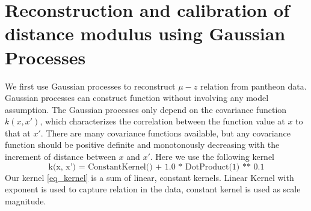 \section{Reconstruction and calibration of distance modulus using Gaussian Processes}
\label{results_gp_pantheon}
We first use Gaussian processes to  reconstruct $\mu-z$ relation from pantheon data. Gaussian processes can construct function without involving any model assumption. The Gaussian processes only depend on the covariance function $k(x, x')$, which characterizes the correlation between the function value at $x$ to that at $x'$. There are many covariance functions available, but any covariance function should be positive definite and monotonously decreasing with the increment of distance between $x$ and $x'$. Here we use the following kernel
\begin{equation}\label{eq_kernel}
	\text{k(x, x') = ConstantKernel() + 1.0 * DotProduct(1) ** 0.1}
\end{equation}
Our kernel \eqref{eq_kernel} is a sum of linear, constant kernels. Linear Kernel with exponent is used to capture relation in the data, constant kernel is used as scale magnitude.



